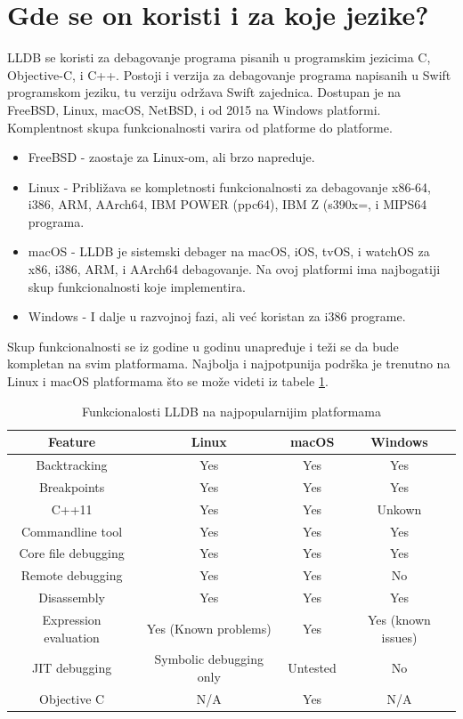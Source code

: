 \documentclass[a4paper]{article}
\begin{document}
\section{Gde se on koristi i za koje jezike? }
\label{sec: Gde se on koristi i za koje jezike?}
LLDB se koristi za debagovanje programa pisanih u programskim jezicima C, Objective-C, i C++. Postoji i verzija za debagovanje programa napisanih u Swift programskom jeziku, tu verziju održava Swift zajednica. 
Dostupan je na FreeBSD, Linux, macOS, NetBSD, i od 2015 na Windows platformi. Komplentnost skupa funkcionalnosti varira od platforme do platforme.
\begin{itemize}
\item FreeBSD - zaostaje za Linux-om, ali brzo napreduje.
\item Linux - Približava se kompletnosti funkcionalnosti za debagovanje x86-64, i386, ARM, AArch64, IBM POWER (ppc64), IBM Z (s390x=, i MIPS64 programa.
\item macOS - LLDB je sistemski debager na macOS, iOS, tvOS, i watchOS za x86, i386, ARM, i AArch64 debagovanje. Na ovoj platformi ima najbogatiji skup funkcionalnosti koje implementira.
\item Windows - I dalje u razvojnoj fazi, ali već koristan za i386 programe.
\end{itemize}
Skup funkcionalnosti se iz godine u godinu unapređuje i teži se da bude kompletan na svim platformama. Najbolja i najpotpunija podrška je trenutno na Linux i macOS platformama što se može videti iz tabele \ref{tab:table lldb features}.

\begin{table}[h!]
\center
\caption{Funkcionalosti LLDB na najpopularnijim platformama}
\label{tab:table lldb features}
\begin{tabular}{|c|c c c|} 
 \hline
 Feature & Linux & macOS & Windows \\ [0.5ex] 
 \hline
 Backtracking & Yes & Yes & Yes \\ 
 Breakpoints & Yes & Yes & Yes \\
 C++11 & Yes & Yes & Unkown \\
 Commandline tool & Yes & Yes & Yes \\
 Core file debugging  & Yes & Yes & Yes \\
  Remote debugging & Yes & Yes & No\\ [1ex] 
 Disassembly & Yes & Yes & Yes  \\
 Expression evaluation & Yes (Known problems)& Yes & Yes (known issues) \\
 JIT debugging & Symbolic debugging only & Untested & No \\
 Objective C & N/A & Yes & N/A \\
 \hline
\end{tabular}
\end{table}
\end{document}
